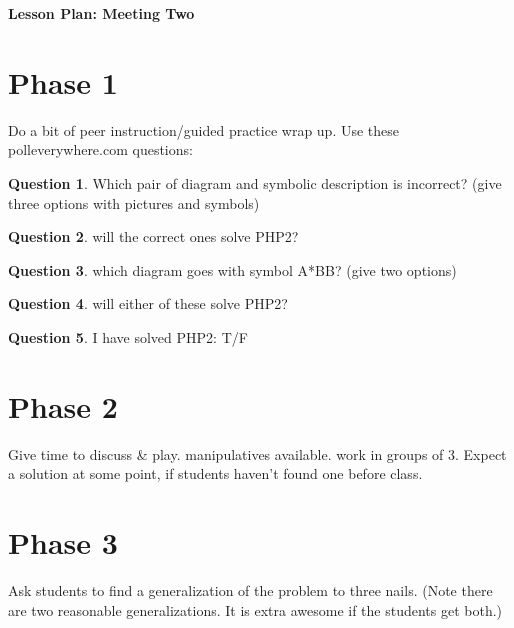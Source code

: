 \documentclass[12pt]{amsart}
\theoremstyle{definition}
\newtheorem{question}{Question}
\begin{document}
\begin{center}
\textbf{\Huge
Lesson Plan: Meeting Two
}
\end{center}
\vspace{.5in}

\section{Phase 1}
Do a bit of peer instruction/guided practice wrap up. 
Use these polleverywhere.com questions:

\begin{question}
 Which pair of diagram and symbolic description is incorrect?  (give three options with pictures and symbols)
\end{question}

\begin{question} will the correct ones solve PHP2?
\end{question}

\begin{question} 
which diagram goes with symbol A*BB? (give two options)
\end{question}

\begin{question} 
will either of these solve PHP2?
\end{question}

\begin{question}
I have solved PHP2:  T/F
\end{question}

\section{Phase 2} 
Give time to discuss \& play. manipulatives available. work in groups of 3. Expect a solution at some point, if students haven't found one before class.

\section{Phase 3}
Ask students to find a generalization of the problem to three nails. (Note there are two reasonable generalizations. It is extra awesome if the students get both.)
\end{document}
